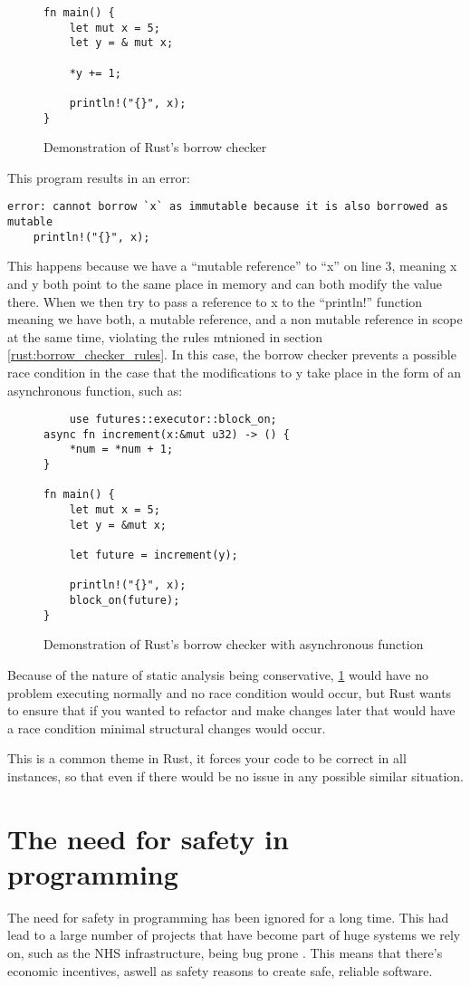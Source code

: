 \documentclass{article}
\begin{document}
\begin{figure}[H]\label{fig:code:borrow_checker_1}
	\begin{lstlisting}
fn main() {
    let mut x = 5;
    let y = & mut x;

    *y += 1;

    println!("{}", x);
}
 	\end{lstlisting}
	\caption{Demonstration of Rust's borrow checker}
\end{figure}
This program results in an error:
\begin{verbatim}
error: cannot borrow `x` as immutable because it is also borrowed as mutable
    println!("{}", x);
\end{verbatim}
This happens because we have a ``mutable reference'' to ``x'' on line 3, meaning x and y both point to the same place in memory and can both modify the value there. When we then try to pass a reference to x to the ``println!'' function meaning we have both, a mutable reference, and a non mutable reference in scope at the same time, violating the rules mtnioned in section \ref{rust:borrow_checker_rules}. In this case, the borrow checker prevents a possible race condition in the case that the modifications to y take place in the form of an asynchronous function, such as:
\begin{figure}[H]
	\begin{lstlisting}
	use futures::executor::block_on;
async fn increment(x:&mut u32) -> () {
	*num = *num + 1;
}

fn main() {
    let mut x = 5;
    let y = &mut x;

    let future = increment(y);

    println!("{}", x);
    block_on(future);
}
 	\end{lstlisting}
	\caption{Demonstration of Rust's borrow checker with asynchronous function}
\end{figure}
Because of the nature of static analysis being conservative, \ref{fig:code:borrow_checker_1} would have no problem executing normally and no race condition would occur, but Rust wants to ensure that if you wanted to refactor and make changes later that would have a race condition minimal structural changes would occur.

This is a common theme in Rust, it forces your code to be correct in all instances, so that even if there would be no issue in any possible similar situation.
\section{The need for safety in programming}
The need for safety in programming has been ignored for a long time. This had lead to a large number of projects that have become part of huge systems we rely on, such as the NHS infrastructure, being bug prone \parencite{cost_of_bugs}. This means that there's economic incentives, aswell as safety reasons to create safe, reliable software.
\end{document}

